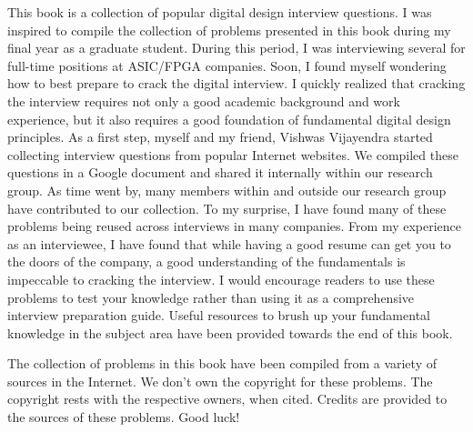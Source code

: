 \documentclass{book}
\begin{document}
This book is a collection of popular digital design interview questions. I was
inspired to compile the collection of problems presented in this book during
my final year as a graduate student. During this period, I was  interviewing several for full-time
positions at ASIC/FPGA companies. Soon, I found myself wondering how to
best prepare to crack the digital interview. I quickly realized that cracking
the interview requires not only a good academic background and work experience, but it also requires a good
foundation of fundamental digital design principles.
As a first step, myself and my friend, Vishwas Vijayendra started collecting interview questions from
popular Internet websites. We compiled these questions in a Google document and shared it internally
within our research group. As time went by, many members within and outside
our research group have contributed to our collection. To my surprise, I have found
many of these problems being reused across interviews in many companies.
From my experience as an interviewee, I have found that while having a good resume
can get you to the doors of the company, a good understanding of the fundamentals
is impeccable to cracking the interview. I would encourage readers to use these
problems to test your knowledge rather than using it as a comprehensive interview
preparation guide. Useful resources to brush up your fundamental knowledge in the
subject area have been provided towards the end of this book.

The collection of problems in this book have been compiled from a
variety of sources in the Internet. We don't own the copyright for these problems.
The copyright rests with the respective owners, when cited.
Credits are provided to the sources of these problems. Good luck!




\newpage
\thispagestyle{empty}

\newpage
\renewcommand{\cftchapdotsep}{\cftdotsep}
\tableofcontents










\printsolutions


\end{document}
